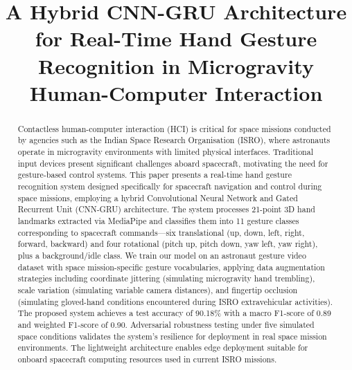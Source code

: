 \documentclass[conference]{IEEEtran}
\begin{document}
\title{A Hybrid CNN-GRU Architecture for Real-Time Hand Gesture Recognition in Microgravity Human-Computer Interaction}

\author{
\and
{}
}

\maketitle

\begin{abstract}
Contactless human-computer interaction (HCI) is critical for space missions conducted by agencies such as the Indian Space Research Organisation (ISRO), where astronauts operate in microgravity environments with limited physical interfaces. Traditional input devices present significant challenges aboard spacecraft, motivating the need for gesture-based control systems. This paper presents a real-time hand gesture recognition system designed specifically for spacecraft navigation and control during space missions, employing a hybrid Convolutional Neural Network and Gated Recurrent Unit (CNN-GRU) architecture. The system processes 21-point 3D hand landmarks extracted via MediaPipe and classifies them into 11 gesture classes corresponding to spacecraft commands—six translational (up, down, left, right, forward, backward) and four rotational (pitch up, pitch down, yaw left, yaw right), plus a background/idle class. We train our model on an astronaut gesture video dataset with space mission-specific gesture vocabularies, applying data augmentation strategies including coordinate jittering (simulating microgravity hand trembling), scale variation (simulating variable camera distances), and fingertip occlusion (simulating gloved-hand conditions encountered during ISRO extravehicular activities). The proposed system achieves a test accuracy of 90.18\% with a macro F1-score of 0.89 and weighted F1-score of 0.90. Adversarial robustness testing under five simulated space conditions validates the system's resilience for deployment in real space mission environments. The lightweight architecture enables edge deployment suitable for onboard spacecraft computing resources used in current ISRO missions.
\end{abstract}
\end{document}
